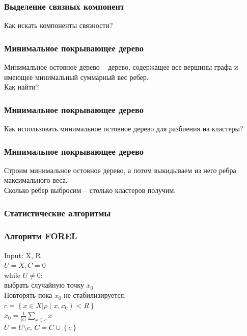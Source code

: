 \documentclass[12pt]{beamer}
\begin{document}
\begin{frame}\frametitle{Выделение связных компонент}
Как искать компоненты связности?
\end{frame}

\begin{frame}\frametitle{Минимальное покрывающее дерево}
Минимальное остовное дерево -- дерево, содержащее все вершины графа и имеющее минимальный суммарный вес ребер.\\
\vspace{5mm}
Как найти?
\end{frame}

\begin{frame}\frametitle{Минимальное покрывающее дерево}
Как использовать минимальное остовное дерево для разбиения на кластеры?
\end{frame}
\begin{frame}\frametitle{Минимальное покрывающее дерево}
Строим минимальное остовное дерево, а потом выкидываем из него ребра максимального веса.\\
\vspace{5mm}
Сколько ребер выбросим -- столько кластеров получим.
\end{frame}

\begin{frame}\frametitle{Статистические алгоритмы}
\end{frame}

\begin{frame}\frametitle{Алгоритм FOREL}
Input: X, R\\
${U = X, C = 0}$\\\vspace{2mm}
while ${U \neq 0}$:\\
\hspace{5mm} выбрать случайную точку $x_0$\\
\vspace{2mm}
\hspace{5mm} Повторять пока $x_0$ не стабилизируется:\\
\vspace{2mm}
\hspace{10mm} ${c = \left\{ x \in X \vert \rho(x, x_0) < R \right\}}$ \\
\vspace{2mm}
\hspace{10mm} $x_0 = \frac{1}{\vert c \vert} \sum\limits_{x \in c} x$\\
\vspace{2mm}
\hspace{5mm} ${U = U \setminus c}$, ${C = C \cup \left\{ c \right\}}$
\end{frame}
\end{document}
